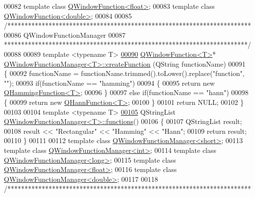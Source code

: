 \begin{DoxyCode}
00082 \textcolor{keyword}{template} \textcolor{keyword}{class }\hyperlink{a00071}{QWindowFunction<float>};
00083 \textcolor{keyword}{template} \textcolor{keyword}{class }\hyperlink{a00071}{QWindowFunction<double>};
00084 
00085 \textcolor{comment}{/***********************************************************************}
00086 \textcolor{comment}{QWindowFunctionManager}
00087 \textcolor{comment}{***********************************************************************/}
00088 
00089 \textcolor{keyword}{template} <\textcolor{keyword}{typename} T>
\hypertarget{a00127_source_l00090}{}\hyperlink{a00072_a3c72b178730b8731087337bcbfcbd4b7}{00090} \hyperlink{a00071}{QWindowFunction<T>}* \hyperlink{a00072_a3c72b178730b8731087337bcbfcbd4b7}{QWindowFunctionManager<T>::createFunction}
      (QString functionName)
00091 \{
00092     functionName = functionName.trimmed().toLower().replace(\textcolor{stringliteral}{"function"}, \textcolor{stringliteral}{""});
00093     \textcolor{keywordflow}{if}(functionName == \textcolor{stringliteral}{"hamming"})
00094     \{
00095         \textcolor{keywordflow}{return} \textcolor{keyword}{new} \hyperlink{a00056}{QHammingFunction<T>};
00096     \}
00097     \textcolor{keywordflow}{else} \textcolor{keywordflow}{if}(functionName == \textcolor{stringliteral}{"hann"})
00098     \{
00099         \textcolor{keywordflow}{return} \textcolor{keyword}{new} \hyperlink{a00057}{QHannFunction<T>};
00100     \}
00101     \textcolor{keywordflow}{return} NULL;
00102 \}
00103 
00104 \textcolor{keyword}{template} <\textcolor{keyword}{typename} T>
\hypertarget{a00127_source_l00105}{}\hyperlink{a00072_ae0508780c15f6c28fb566dfe76c9a082}{00105} QStringList \hyperlink{a00072_ae0508780c15f6c28fb566dfe76c9a082}{QWindowFunctionManager<T>::functions}()
00106 \{
00107     QStringList result;
00108     result << \textcolor{stringliteral}{"Rectangular"} << \textcolor{stringliteral}{"Hamming"} << \textcolor{stringliteral}{"Hann"};
00109     \textcolor{keywordflow}{return} result;
00110 \}
00111 
00112 \textcolor{keyword}{template} \textcolor{keyword}{class }\hyperlink{a00072}{QWindowFunctionManager<short>};
00113 \textcolor{keyword}{template} \textcolor{keyword}{class }\hyperlink{a00072}{QWindowFunctionManager<int>};
00114 \textcolor{keyword}{template} \textcolor{keyword}{class }\hyperlink{a00072}{QWindowFunctionManager<long>};
00115 \textcolor{keyword}{template} \textcolor{keyword}{class }\hyperlink{a00072}{QWindowFunctionManager<float>};
00116 \textcolor{keyword}{template} \textcolor{keyword}{class }\hyperlink{a00072}{QWindowFunctionManager<double>};
00117 
00118 \textcolor{comment}{/***********************************************************************}

\end{DoxyCode}
